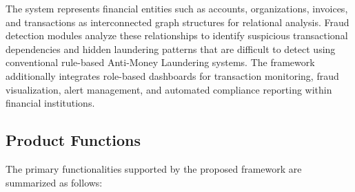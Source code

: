 The system represents financial entities such as accounts, organizations, invoices, and transactions as interconnected graph structures for relational analysis. Fraud detection modules analyze these relationships to identify suspicious transactional dependencies and hidden laundering patterns that are difficult to detect using conventional rule-based Anti-Money Laundering systems. The framework additionally integrates role-based dashboards for transaction monitoring, fraud visualization, alert management, and automated compliance reporting within financial institutions.


\subsection[Product Functions]{\textbf{Product Functions}}

The primary functionalities supported by the proposed framework are summarized as follows:
\renewcommand{\theenumi}{\roman{enumi}}\renewcommand{\labelenumi}{\textbf{ (\theenumi)}}%

